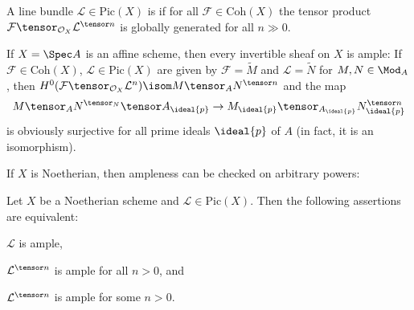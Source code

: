 \documentclass[wip, algebra]{bsteffan-lecturenotes}
\newcommand{\cO}{\mathcal{O}}
\newcommand{\cF}{\mathcal{F}}
\newcommand{\cL}{\mathcal{L}}
\newcommand{\Pic}{\mathrm{Pic}}
\newcommand{\Coh}{\mathrm{Coh}}
\begin{document}
\begin{definition}
	A line bundle $\cL \in \Pic(X)$ is  if for all $\cF \in \Coh(X)$ the tensor product $\cF \tensor_{\cO_X} \cL^{\tensor n}$ is globally generated for all $n \gg 0$.
\end{definition}
\begin{example}
	If $X = \Spec A$ is an affine scheme, then every invertible sheaf on $X$ is ample:
	If $\cF \in \Coh(X)$, $\cL \in \Pic(X)$ are given by $\cF = \widetilde{M}$ and $\cL = \widetilde{N}$ for $M, N \in \Mod_A$, then $H^0(\cF \tensor_{\cO_X} \cL^n) \isom M \tensor_A N^{\tensor n}$ and the map 
	\begin{equation*}
		M \tensor_A N^{\tensor_N} \tensor A_{\ideal{p}} \to M_{\ideal{p}} \tensor_{A_{\ideal{p}}} N_{\ideal{p}}^{\tensor n}
	\end{equation*}
	is obviously surjective for all prime ideals $\ideal{p}$ of $A$ (in fact, it is an isomorphism).
\end{example}
If $X$ is Noetherian, then ampleness can be checked on arbitrary powers:
\begin{proposition}
	Let $X$ be a Noetherian scheme and $\cL \in \Pic(X)$.
	Then the following assertions are equivalent:
	\begin{alphanumerate}
		\item\label{en:inv:ample1} $\cL$ is ample, 
		\item\label{en:inv:ample2} $\cL^{\tensor n}$ is ample for all $n > 0$, and
		\item\label{en:inv:ample3} $\cL^{\tensor n}$ is ample for some $n > 0$.
	\end{alphanumerate}
\end{proposition}
\end{document}

